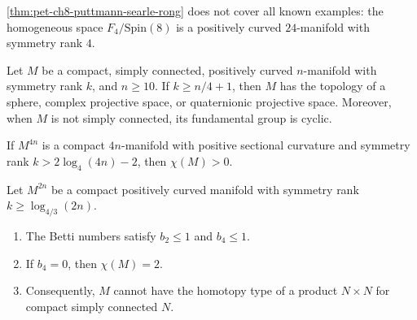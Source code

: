 \begin{remark}
  \label{rem:pet-ch8-f4-spin8-exception}
  \cref{thm:pet-ch8-puttmann-searle-rong} does not cover all known examples:
  the homogeneous space $F_4/\mathrm{Spin}(8)$ is a positively curved
  $24$-manifold with symmetry rank $4$.
\end{remark}

\begin{theorem}
  \label{thm:pet-ch8-wilking-symmetry-rank-classification}
  Let $M$ be a compact, simply connected, positively curved $n$-manifold with
  symmetry rank $k$, and $n\ge10$. If $k\ge n/4+1$, then $M$ has the topology
  of a sphere, complex projective space, or quaternionic projective space.
  Moreover, when $M$ is not simply connected, its fundamental group is cyclic.
\end{theorem}

\begin{theorem}
  \label{thm:pet-ch8-kennard-2013-euler-characteristic}
  If $M^{4n}$ is a compact $4n$-manifold with positive sectional curvature and
  symmetry rank $k>2\log_4(4n)-2$, then $\chi(M)>0$.
\end{theorem}

\begin{theorem}
  \label{thm:pet-ch8-kennard-amann-betti-numbers}
  Let $M^{2n}$ be a compact positively curved manifold with symmetry rank
  $k\ge\log_{4/3}(2n)$.
  \begin{enumerate}
    \item The Betti numbers satisfy $b_2\le1$ and $b_4\le1$.
    \item If $b_4=0$, then $\chi(M)=2$.
    \item Consequently, $M$ cannot have the homotopy type of a product
      $N\times N$ for compact simply connected $N$.
  \end{enumerate}
\end{theorem}

